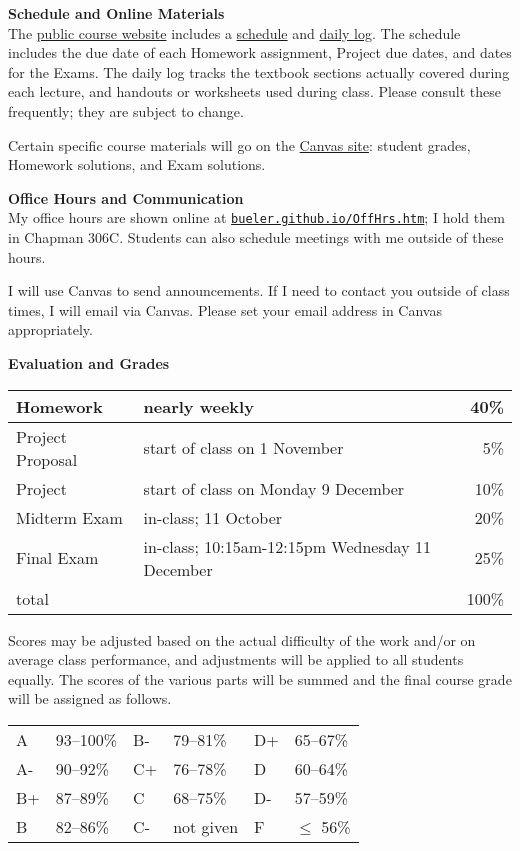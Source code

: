 \documentclass[12pt]{article}
\renewcommand{\emph}[1]{\textsf{\textbf{#1}}}
\newcommand{\localhead}[1]{\par\smallskip\textbf{#1} \smallskip\nobreak\\}%
\def\heading#1{\localhead{\large\emph{#1}}}
\begin{document}
\heading{Schedule and Online Materials}
The \href{https://bueler.github.io/numerical/}{public course website} includes a \href{https://bueler.github.io/numerical/assets/general/F24/schedule.pdf}{schedule} and \href{https://bueler.github.io/numerical/daily.html}{daily log}.  The schedule includes the due date of each Homework assignment, Project due dates, and dates for the Exams.  The daily log tracks the textbook sections actually covered during each lecture, and handouts or worksheets used during class.  Please consult these frequently; they are subject to change.

Certain specific course materials will go on the \href{https://canvas.alaska.edu/courses/21626}{Canvas site}: student grades, Homework solutions, and Exam solutions.

\heading{Office Hours and Communication}
My office hours are shown online at \href{http://bueler.github.io/OffHrs.htm}{\texttt{bueler.github.io/OffHrs.htm}}; I hold them in Chapman 306C.  Students can also schedule meetings with me outside of these hours.

I will use Canvas to send announcements.  If I need to contact you outside of class times, I will email via Canvas.  Please set your email address in Canvas appropriately.

\heading{Evaluation and Grades}
\vskip -10pt

\begin{tabular}{|l|l|r|}
\hline
Homework         & nearly weekly & 40\% \\
\hline
Project Proposal & start of class on 1 November & 5\% \\
\hline
Project          & {\color{red} start of class on Monday 9 December} & 10\% \\
\hline
Midterm Exam     & in-class; 11 October & 20\%  \\
\hline
Final Exam       & in-class; 10:15am-12:15pm Wednesday 11 December & 25\% \\
\hline
total            & & 100\% \\
\hline
\end{tabular}

Scores may be adjusted based on the actual difficulty of the work and/or on average class performance, and adjustments will be applied to all students equally.  The scores of the various parts will be summed and the final course grade will be assigned as follows.

\begin{tabular}{llllll}
A  & 93--100\% & B- & 79--81\%  & D+ & 65--67\%  \\
A- & 90--92\%  & C+ & 76--78\%  & D  & 60--64\%  \\
B+ & 87--89\%  & C  & 68--75\%  & D- & 57--59\%  \\
B  & 82--86\%  & C- & not given & F  & $\le$ 56\%
\end{tabular}
\end{document}
